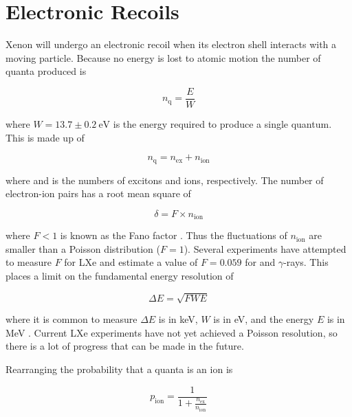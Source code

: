 \section{Electronic Recoils}
\label{sec:er}
Xenon will undergo an electronic recoil when its electron shell interacts with a moving particle.  Because no energy
is lost to atomic motion the number of quanta produced is

\begin{equation}
n_{\mathrm{q}} = \frac{E}{W}
\label{eq:nquant_er}
\end{equation}

\noindent where $W = 13.7 \pm 0.2\ \mathrm{eV}$  is the energy required to produce a single quantum.  This is made up
of

\begin{equation}
n_{\mathrm{q}} = n_{\mathrm{ex}} + n_{\mathrm{ion}}
\label{eq:quanta}
\end{equation}

\noindent where \nex and \nion is the numbers of excitons and ions, respectively.  The number of electron-ion pairs has a root mean square
of

\begin{equation}
\delta = F \times n_{\mathrm{ion}}
\label{eq:fano}
\end{equation}

\noindent where $F < 1$ is known as the Fano factor .  Thus the fluctuations of $n_{\mathrm{ion}}$ are smaller than a
Poisson distribution ($F = 1$).  Several experiments have attempted to measure $F$ for LXe  and
estimate a value of $F = 0.059$ for \electron and $\gamma$-rays.  This places a limit on the fundamental energy resolution of

\begin{equation}
\Delta E = \sqrt{F W E}
\end{equation}

\noindent where it is common to measure $\Delta E$ is in keV, $W$ is in eV, and the energy $E$ is in MeV .  Current
LXe experiments have not yet achieved a Poisson resolution, so there is a lot of progress that can be made in the future.

Rearranging  the probability that a quanta is an ion is

\begin{equation}
p_{\mathrm{ion}} = \frac{1}{1 + \frac{ n_{\mathrm{ex}} }{ n_{\mathrm{ion}} }}
\end{equation}

